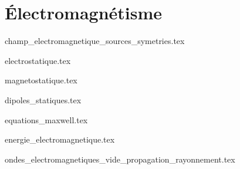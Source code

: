 \part{Électromagnétisme}

{champ_electromagnetique_sources_symetries.tex}

{electrostatique.tex}

{magnetostatique.tex}

{dipoles_statiques.tex}

{equations_maxwell.tex}

{energie_electromagnetique.tex}

{ondes_electromagnetiques_vide_propagation_rayonnement.tex}